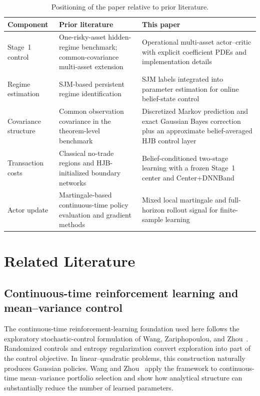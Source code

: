\documentclass[a4paper,10pt]{article}
\begin{document}
\begin{table}[H]
\centering
\small
\caption{Positioning of the paper relative to prior literature.}
\label{tab:positioning}
\begin{tabular}{>{\raggedright\arraybackslash}p{} >{\raggedright\arraybackslash}p{} >{\raggedright\arraybackslash}p{}}
\toprule
Component & Prior literature & This paper \\
\midrule
Stage~1 control & One-risky-asset hidden-regime benchmark; common-covariance multi-asset extension & Operational multi-asset actor--critic with explicit coefficient PDEs and implementation details \\
Regime estimation & SJM-based persistent regime identification & SJM labels integrated into parameter estimation for online belief-state control \\
Covariance structure & Common observation covariance in the theorem-level benchmark & Discretized Markov prediction and exact Gaussian Bayes correction plus an approximate belief-averaged HJB control layer \\
Transaction costs & Classical no-trade regions and HJB-initialized boundary networks & Belief-conditioned two-stage learning with a frozen Stage~1 center and Center+DNNBand \\
Actor update & Martingale-based continuous-time policy evaluation and gradient methods & Mixed local martingale and full-horizon rollout signal for finite-sample learning \\
\bottomrule
\end{tabular}
\end{table}

\section{Related Literature}

\subsection{Continuous-time reinforcement learning and mean--variance control}

The continuous-time reinforcement-learning foundation used here follows the exploratory stochastic-control formulation of Wang, Zariphopoulou, and Zhou~\cite{wangzariphopoulouzhou2020}. Randomized controls and entropy regularization convert exploration into part of the control objective. In linear--quadratic problems, this construction naturally produces Gaussian policies. Wang and Zhou~\cite{wangzhou2020} apply the framework to continuous-time mean--variance portfolio selection and show how analytical structure can substantially reduce the number of learned parameters.
\end{document}
